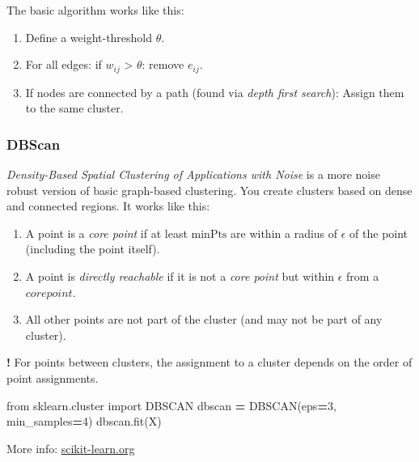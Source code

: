 \documentclass[
]{book}
\newenvironment{Shaded}{\begin{snugshade}}{\end{snugshade}}
\newcommand{\DecValTok}[1]{\textcolor[rgb]{0.00,0.00,0.81}{#1}}
\newcommand{\ImportTok}[1]{#1}
\newcommand{\NormalTok}[1]{#1}
\newcommand{\OperatorTok}[1]{\textcolor[rgb]{0.81,0.36,0.00}{\textbf{#1}}}
\begin{document}
The basic algorithm works like this:

\begin{enumerate}
\def\labelenumi{\arabic{enumi}.}
\item
  Define a weight-threshold \(\theta\).
\item
  For all edges: if \(w_{ij}\) \textgreater{} \(\theta\): remove \(e_{ij}\).
\item
  If nodes are connected by a path (found via \emph{depth first search}):
  Assign them to the same cluster.
\end{enumerate}

\hypertarget{dbscan}{%
\subsubsection{DBScan}\label{dbscan}}

\emph{Density-Based Spatial Clustering of Applications with Noise} is a more
noise robust version of basic graph-based clustering. You create
clusters based on dense and connected regions. It works like this:

\begin{enumerate}
\def\labelenumi{\arabic{enumi}.}
\item
  A point is a \emph{core point} if at least \(\text{minPts}\) are within a
  radius of \(\epsilon\) of the point (including the point itself).
\item
  A point is \emph{directly reachable} if it is not a \emph{core point} but
  within \(\epsilon\) from a \(core point\).
\item
  All other points are not part of the cluster (and may not be part of
  any cluster).
\end{enumerate}

\textbf{!} For points between clusters, the assignment to a cluster depends
on the order of point assignments.

\begin{Shaded}
\begin{Highlighting}[]
\ImportTok{from}\NormalTok{ sklearn.cluster }\ImportTok{import}\NormalTok{ DBSCAN}
\NormalTok{dbscan }\OperatorTok{=}\NormalTok{ DBSCAN(eps}\OperatorTok{=}\DecValTok{3}\NormalTok{, min\_samples}\OperatorTok{=}\DecValTok{4}\NormalTok{)}
\NormalTok{dbscan.fit(X)}
\end{Highlighting}
\end{Shaded}

More info:
\href{https://scikit-learn.org/stable/modules/generated/sklearn.cluster.DBSCAN.html}{scikit-learn.org}\\
\end{document}
